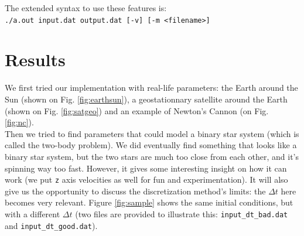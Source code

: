 \documentclass{article}
\begin{document}
The extended syntax to use these features is:\\
\texttt{./a.out input.dat output.dat [-v] [-m <filename>]}


\section*{Results}
We first tried our implementation with real-life parameters: the Earth around the Sun (shown on Fig. \ref{fig:earthsun}), a geostationnary satellite around the Earth (shown on Fig. \ref{fig:satgeo}) and an example of Newton's Cannon (on Fig. \ref{fig:nc}).\\

Then we tried to find parameters that could model a binary star system (which is called the two-body problem). We did eventually find something that looks like a binary star system, but the two stars are much too close from each other, and it's spinning way too fast. However, it gives some interesting insight on how it can work (we put \texttt{z} axis velocities as well for fun and experimentation). It will also give us the opportunity to discuss the discretization method's limits: the $\Delta t$ here becomes very relevant. Figure \ref{fig:sample} shows the same initial conditions, but with a different $\Delta t$ (two files are provided to illustrate this: \texttt{input\_dt\_bad.dat} and \texttt{input\_dt\_good.dat}). 
\end{document}
